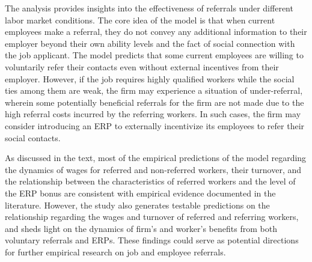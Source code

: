 \documentclass[12pt]{article}
\begin{document}
The analysis provides insights into the effectiveness of referrals under different labor market conditions. The core idea of the model is that when current employees make a referral, they do not convey any additional information to their employer beyond their own ability levels and the fact of social connection with the job applicant. The model predicts that some current employees are willing to voluntarily refer their contacts even without external incentives from their employer. However, if the job requires highly qualified workers while the social ties among them are weak, the firm may experience a situation of under-referral, wherein some potentially beneficial referrals for the firm are not made due to the high referral costs incurred by the referring workers. In such cases, the firm may consider introducing an ERP to externally incentivize its employees to refer their social contacts.

As discussed in the text, most of the empirical predictions of the model regarding the dynamics of wages for referred and non-referred workers, their turnover, and the relationship between the characteristics of referred workers and the level of the ERP bonus are consistent with empirical evidence documented in the literature.  However, the study also generates testable predictions on the relationship regarding the wages and turnover of referred and referring workers, and sheds light on the dynamics of firm's and worker's benefits from both voluntary referrals and ERPs. These findings could serve as potential directions for further empirical research on job and employee referrals.

\singlespacing
\setlength\bibsep{0pt}





\clearpage

\onehalfspacing





\end{document}
